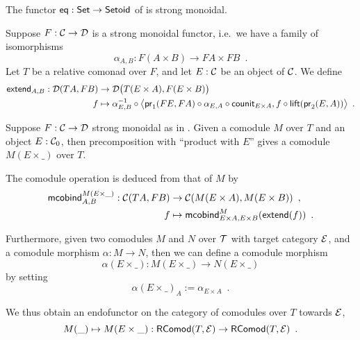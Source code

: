 \documentclass{amsart}
\begin{document}
\begin{example}
  The functor $\eq: \Set \to \Setoid$ of  is strong monoidal.
\end{example}


\begin{definition}\label{def:extend}
 Suppose $F : \C\to \D$ is a strong monoidal functor, i.e.\ we have a family of isomorphisms
  \[ \alpha_{A,B} : F(A\times B) \to FA\times FB\enspace . \] 
  Let $T$ be a relative comonad over $F$, and let $E : \C$ be an object of $\C$.
 We define
 \begin{align*} \extend_{A,B} : \D(TA,FB) &\to \D\bigl(T(E\times A),F(E\times B)\bigr)\\
                                   f   &\mapsto \comp{\bigl\langle \comp{\counit_{E\times A}}{\comp{\alpha_{E,A}}{\pr_1(FE,FA)}}, \comp{\lift(\pr_2(E,A))}{f} \bigr\rangle}{\alpha_{E,B}^{-1}} \enspace .
\end{align*}



\end{definition}



\begin{definition}\label{def:product_in_context}
 Suppose $F:\C\to\D$ strong monoidal as in .
 Given a comodule $M$ over $T$ and an object $E:\C_0$, then precomposition with \enquote{product with $E$}
 gives a comodule $M(E\times\_)$ over $T$.
 
 The comodule operation is deduced from that of $M$ by 
 \begin{align*} \mcobind^{M(E\times\_)}_{A,B} : \C(TA,FB)&\to \C(M(E\times A), M(E\times B)) \enspace ,\\
                                                      f &\mapsto \mcobind^M_{E\times A,E\times B}(\extend(f)) \enspace .
  \end{align*}                                        

 \noindent
 Furthermore, given two comodules $M$ and $N$ over $\T$ with target category $\E$, and a comodule morphism $\alpha : M \to N$, then 
 we can define a comodule morphism \[\alpha(E\times \_) : M(E\times \_) \to N(E\times \_) \] by setting
          \[ \alpha(E \times \_)_A := \alpha_{E\times A} \enspace . \]
  
  \noindent
  We thus obtain an endofunctor on the category of comodules over $T$ towards $\E$,
   \[ M(\_) \mapsto  M (E\times \_) : \RComod(T,\E) \to \RComod(T,\E) \enspace . \]
 

\end{definition}
\end{document}
